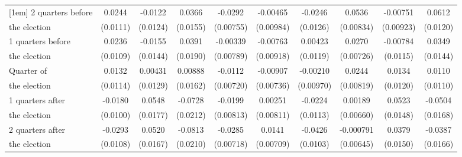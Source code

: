 \begin{table}[!ht]
\begin{tabular}{l*{9}{c}}
[1em]
 2 quarters before&      0.0244\sym{*}  &     -0.0122         &      0.0366\sym{*}  &     -0.0292\sym{***}&    -0.00465         &     -0.0246         &      0.0536\sym{***}&    -0.00751         &      0.0612\sym{***}\\
 the election                    &    (0.0111)         &    (0.0124)         &    (0.0155)         &   (0.00755)         &   (0.00984)         &    (0.0126)         &   (0.00834)         &   (0.00923)         &    (0.0120)         \\
[1em]
 1 quarters before&      0.0236\sym{*}  &     -0.0155         &      0.0391\sym{*}  &    -0.00339         &    -0.00763         &     0.00423         &      0.0270\sym{***}&    -0.00784         &      0.0349\sym{*}  \\
  the election                   &    (0.0109)         &    (0.0144)         &    (0.0190)         &   (0.00789)         &   (0.00918)         &    (0.0119)         &   (0.00726)         &    (0.0115)         &    (0.0144)         \\
[1em]
Quarter of &      0.0132         &     0.00431         &     0.00888         &     -0.0112         &    -0.00907         &    -0.00210         &      0.0244\sym{**} &      0.0134         &      0.0110         \\
the election                    &    (0.0114)         &    (0.0129)         &    (0.0162)         &   (0.00720)         &   (0.00736)         &   (0.00970)         &   (0.00819)         &    (0.0120)         &    (0.0110)         \\
[1em]
 1 quarters after &     -0.0180         &      0.0548\sym{**} &     -0.0728\sym{***}&     -0.0199\sym{*}  &     0.00251         &     -0.0224\sym{*}  &     0.00189         &      0.0523\sym{***}&     -0.0504\sym{**} \\
 the election                   &    (0.0100)         &    (0.0177)         &    (0.0212)         &   (0.00813)         &   (0.00811)         &    (0.0113)         &   (0.00660)         &    (0.0148)         &    (0.0168)         \\
[1em]
 2 quarters after &     -0.0293\sym{**} &      0.0520\sym{**} &     -0.0813\sym{***}&     -0.0285\sym{***}&      0.0141\sym{*}  &     -0.0426\sym{***}&   -0.000791         &      0.0379\sym{*}  &     -0.0387\sym{*}  \\
the election                    &    (0.0108)         &    (0.0167)         &    (0.0210)         &   (0.00718)         &   (0.00709)         &    (0.0103)         &   (0.00645)         &    (0.0150)         &    (0.0166)         \\

\end{tabular}
\end{table}
